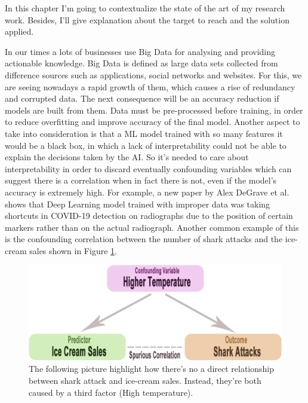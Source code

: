 In this chapter I'm going to contextualize the state of the art of my research work. 
Besides, I'll give explanation about the target to reach and the solution applied.\par
In our times a lots of businesses use Big Data for analysing and providing actionable knowledge.
Big Data is defined as large data sets collected from difference sources such as applications, social networks and websites.
For this, we are seeing nowadays a rapid growth of them, which causes a rise of redundancy and corrupted data.
The next consequence will be an accuracy reduction if models are built from them.
Data must be pre-processed before training, in order to reduce overfitting and improve accuracy of the final model.\newline
Another aspect to take into consideration is that a ML model trained with so many features it would be a black box, in which a lack of interpretability could not be able to explain the decisions taken by the AI.
So it's needed to care about interpretability in order to discard eventually confounding variables  which can suggest there is a correlation when in fact there is not, even if the model's accuracy is extremely high.
For example, a new paper by Alex DeGrave et al.\cite{degrave2021ai} shows that Deep Learning model trained with improper data was taking shortcuts in COVID-19 detection on radiographs due to the position of certain markers rather than on the actual radiograph.
Another common example of this is the confounding correlation between the number of shark attacks and the ice-cream sales shown in Figure \ref{fig:shark}.\newline
\begin{figure}[H]
    \centering
    \includegraphics[scale=0.25]{images/confounding.png}
    \caption{The following picture\cite{shark-icecream} highlight how there's no a direct relationship between shark attack and ice-cream sales. Instead, they're both caused by a third factor (High temperature)\cite{siegel2019ice}.}
    \label{fig:shark}
\end{figure}
